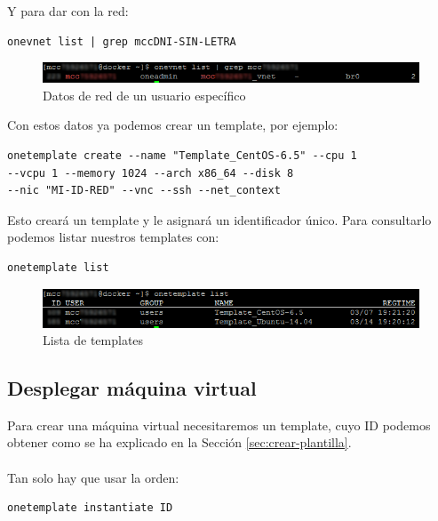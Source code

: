 Y para dar con la red:

\begin{lstlisting}
onevnet list | grep mccDNI-SIN-LETRA
\end{lstlisting}

\begin{figure}[H]
	\centering
	\includegraphics[width=14cm]{img/onevnet-list}
	\caption{Datos de red de un usuario específico}
	\label{fig:onevnet-list}
\end{figure}

Con estos datos ya podemos crear un template, por ejemplo:

\begin{lstlisting}
onetemplate create --name "Template_CentOS-6.5" --cpu 1 
--vcpu 1 --memory 1024 --arch x86_64 --disk 8 
--nic "MI-ID-RED" --vnc --ssh --net_context
\end{lstlisting}

Esto creará un template y le asignará un identificador único. Para consultarlo podemos listar nuestros templates con:

\begin{lstlisting}
onetemplate list
\end{lstlisting}

\begin{figure}[H]
	\centering
	\includegraphics[width=14cm]{img/onetemplate-list}
	\caption{Lista de templates}
	\label{fig:onetemplate-list}
\end{figure}

\subsection{Desplegar máquina virtual}

Para crear una máquina virtual necesitaremos un template, cuyo ID podemos obtener como se ha explicado en la Sección \ref{sec:crear-plantilla}.
\\ \\
Tan solo hay que usar la orden:

\begin{lstlisting}
onetemplate instantiate ID
\end{lstlisting}

